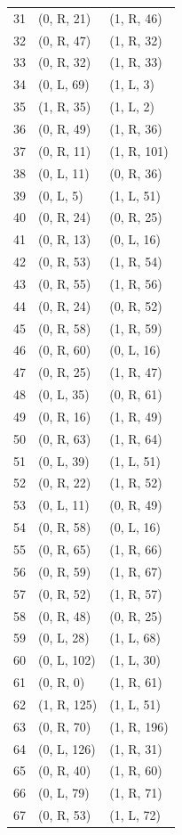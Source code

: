 \begin{longtable}{rll}
31 & (0, R, 21) & (1, R, 46) \\
32 & (0, R, 47) & (1, R, 32) \\
33 & (0, R, 32) & (1, R, 33) \\
34 & (0, L, 69) & (1, L, 3) \\
35 & (1, R, 35) & (1, L, 2) \\
36 & (0, R, 49) & (1, R, 36) \\
37 & (0, R, 11) & (1, R, 101) \\
38 & (0, L, 11) & (0, R, 36) \\
39 & (0, L, 5) & (1, L, 51) \\
40 & (0, R, 24) & (0, R, 25) \\
41 & (0, R, 13) & (0, L, 16) \\
42 & (0, R, 53) & (1, R, 54) \\
43 & (0, R, 55) & (1, R, 56) \\
44 & (0, R, 24) & (0, R, 52) \\
45 & (0, R, 58) & (1, R, 59) \\
46 & (0, R, 60) & (0, L, 16) \\
47 & (0, R, 25) & (1, R, 47) \\
48 & (0, L, 35) & (0, R, 61) \\
49 & (0, R, 16) & (1, R, 49) \\
50 & (0, R, 63) & (1, R, 64) \\
51 & (0, L, 39) & (1, L, 51) \\
52 & (0, R, 22) & (1, R, 52) \\
53 & (0, L, 11) & (0, R, 49) \\
54 & (0, R, 58) & (0, L, 16) \\
55 & (0, R, 65) & (1, R, 66) \\
56 & (0, R, 59) & (1, R, 67) \\
57 & (0, R, 52) & (1, R, 57) \\
58 & (0, R, 48) & (0, R, 25) \\
59 & (0, L, 28) & (1, L, 68) \\
60 & (0, L, 102) & (1, L, 30) \\
61 & (0, R, 0) & (1, R, 61) \\
62 & (1, R, 125) & (1, L, 51) \\
63 & (0, R, 70) & (1, R, 196) \\
64 & (0, L, 126) & (1, R, 31) \\
65 & (0, R, 40) & (1, R, 60) \\
66 & (0, L, 79) & (1, R, 71) \\
67 & (0, R, 53) & (1, L, 72) \\

\end{longtable}
